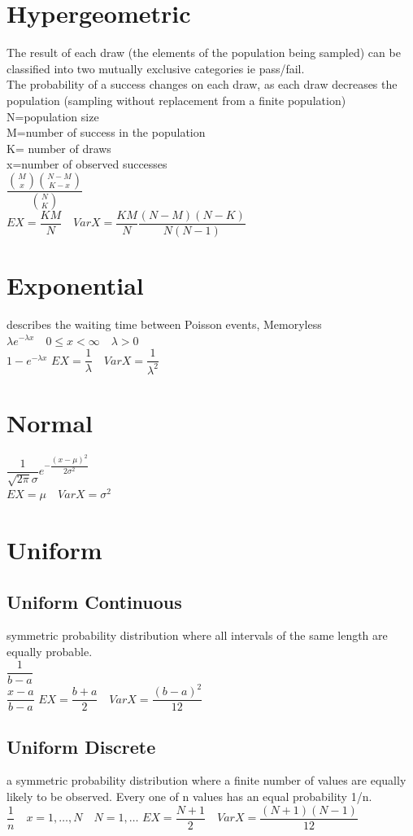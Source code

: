 \documentclass[openany]{book}
\begin{document}
\begin{flushleft}
\section{Hypergeometric}
The result of each draw (the elements of the population being sampled) can be classified into two mutually exclusive categories ie pass/fail.\\
The probability of a success changes on each draw, as each draw decreases the population (sampling without replacement from a finite population)\\
N=population size\\
M=number of success in the population\\
K= number of draws\\
x=number of observed successes\\
$\dfrac{\binom{M}{x}\binom{N-M}{K-x}}{\binom{N}{K}}$\\
$EX=\dfrac{KM}{N} \quad VarX= \dfrac{KM}{N}\dfrac{(N-M)(N-K)}{N(N-1)}$
\section{Exponential}
describes the waiting time between Poisson events, Memoryless\\
$\lambda e^{-\lambda x} \quad 0\leq x<\infty \quad \lambda>0$\\
$1-e^{-\lambda x}$\medbreak
$EX=\dfrac{1}{\lambda} \quad VarX=\dfrac{1}{\lambda^2}$
\section{Normal}
$\dfrac{1}{\sqrt{2\pi}\sigma}e^{-\dfrac{(x-\mu)^2}{2\sigma^2}}$\\
$EX=\mu \quad VarX=\sigma^2$
\section{Uniform}
\subsection{Uniform Continuous}
symmetric probability distribution where all intervals of the same length are equally probable.\\
$\dfrac{1}{b-a}$\\
$\dfrac{x-a}{b-a}$\medbreak
$EX=\dfrac{b+a}{2} \quad VarX=\dfrac{(b-a)^2}{12}$
\subsection{Uniform Discrete}
a symmetric probability distribution where a finite number of values are equally likely to be observed. Every one of n values has an equal probability 1/n.\\
$\dfrac{1}{n} \quad x=1,\dots,N \quad N=1,\dots$\medbreak
$EX=\dfrac{N+1}{2} \quad VarX=\dfrac{(N+1)(N-1)}{12}$

\end{flushleft}
\end{document}

